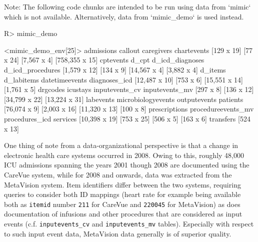 \documentclass[
  notitle]{jss}
\begin{document}
\begin{CodeChunk}
\begin{CodeOutput}
Note: The following code chunks are intended to be run using data from
`mimic` which is not available. Alternatively, data from `mimic_demo`
is used instead.
\end{CodeOutput}
\end{CodeChunk}

\begin{CodeChunk}
\begin{CodeInput}
R> mimic_demo
\end{CodeInput}
\begin{CodeOutput}
<mimic_demo_env[25]>
        admissions            callout         caregivers        chartevents 
        [129 x 19]          [77 x 24]        [7,567 x 4]     [758,355 x 15] 
         cptevents              d_cpt    d_icd_diagnoses   d_icd_procedures 
      [1,579 x 12]          [134 x 9]       [14,567 x 4]        [3,882 x 4] 
           d_items         d_labitems     datetimeevents      diagnoses_icd 
     [12,487 x 10]          [753 x 6]      [15,551 x 14]        [1,761 x 5] 
          drgcodes           icustays     inputevents_cv     inputevents_mv 
         [297 x 8]         [136 x 12]      [34,799 x 22]      [13,224 x 31] 
         labevents microbiologyevents       outputevents           patients 
      [76,074 x 9]       [2,003 x 16]      [11,320 x 13]          [100 x 8] 
     prescriptions procedureevents_mv     procedures_icd           services 
     [10,398 x 19]         [753 x 25]          [506 x 5]          [163 x 6] 
         transfers 
        [524 x 13] 
\end{CodeOutput}
\end{CodeChunk}

One thing of note from a data-organizational perspective is that a
change in electronic health care systems occurred in 2008. Owing to
this, roughly 48,000 ICU admissions spanning the years 2001 though 2008
are documented using the CareVue system, while for 2008 and onwards,
data was extracted from the MetaVision system. Item identifiers differ
between the two systems, requiring queries to consider both ID mappings
(heart rate for example being available both as \texttt{itemid} number
\texttt{211} for CareVue and \texttt{220045} for MetaVision) as does
documentation of infusions and other procedures that are considered as
input events (c.f. \texttt{inputevents\_cv} and \texttt{inputevents\_mv}
tables). Especially with respect to such input event data, MetaVision
data generally is of superior quality.
\end{document}
